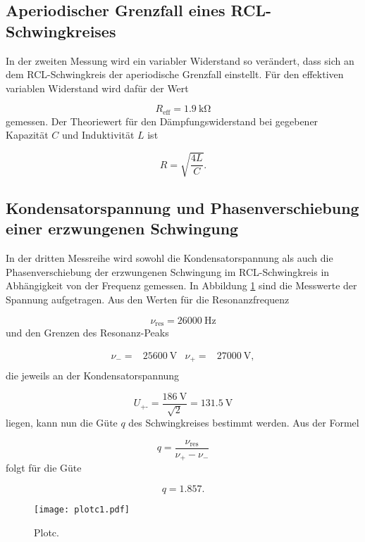 \subsection{Aperiodischer Grenzfall eines RCL-Schwingkreises}

In der zweiten Messung wird ein variabler Widerstand so verändert, dass
sich an dem RCL-Schwingkreis der aperiodische Grenzfall einstellt.
Für den effektiven variablen Widerstand wird dafür der Wert

\begin{equation}
  R_\text{eff} = \SI{1.9}{\kilo\ohm}
\end{equation}
gemessen.
Der Theoriewert für den Dämpfungswiderstand bei gegebener Kapazität $C$ und
Induktivität $L$ ist

\begin{equation}
  R = \sqrt{\frac{4L}{C}}.
\end{equation}


\subsection{Kondensatorspannung und Phasenverschiebung
einer erzwungenen Schwingung}

In der dritten Messreihe wird sowohl die Kondensatorspannung als auch die
Phasenverschiebung der erzwungenen Schwingung im RCL-Schwingkreis in
Abhängigkeit von der Frequenz gemessen. In Abbildung \ref{fig:plotc1} sind
die Messwerte der Spannung aufgetragen. Aus den Werten für die
Resonanzfrequenz

\begin{equation}
  \nu_\text{res} = \SI{26000}{\hertz}
\end{equation}
und den Grenzen des Resonanz-Peaks

\begin{align}
  \nu_- = & \SI{25600}{\V} & \nu_+ = & \SI{27000}{\V}, \\
\end{align}
die jeweils an der Kondensatorspannung

\begin{equation}
  U_\text{+-} = \frac{\SI{186}{\V}}{\sqrt{2}} = \SI{131.5}{\V}
\end{equation}
liegen, kann nun die Güte $q$ des Schwingkreises bestimmt werden.
Aus der Formel

\begin{equation}
  q = \frac{\nu_\text{res}}{\nu_+ - \nu_-}
\end{equation}
folgt für die Güte

\begin{equation}
  q = 1.857 .
\end{equation}




\begin{figure}[h]
  \centering
  \texttt{[image: plotc1.pdf]}
  \caption{Plotc.}
  \label{fig:plotc1}
\end{figure}
